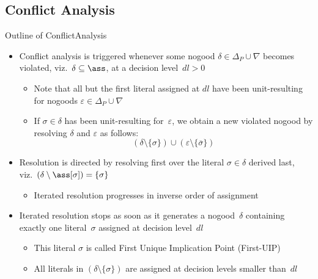 \subsection{Conflict Analysis}
\begin{frame}{Outline of {ConflictAnalysis}}
\begin{itemize}
\item Conflict analysis is triggered whenever
      some nogood $\delta\in\Delta_P\cup\nabla$
      becomes violated, viz.\ $\delta\subseteq\ass$,
      at a decision level~$\mathit{dl}>0$
      \begin{itemize}
      \item Note that all but the first literal assigned at $\mathit{dl}$
        have been unit-resulting for nogoods
        $\varepsilon\in\Delta_P\cup\nabla$
      \item If $\sigma\in\delta$ has been unit-resulting for~$\varepsilon$,
        we obtain a new violated nogood
        by resolving $\delta$ and $\varepsilon$ as follows:
        \[
        (\delta\setminus\{\sigma\})\cup(\varepsilon\setminus\{\overline{\sigma}\})
        \]
      \end{itemize}
\pause
\item Resolution is directed by resolving first over the literal $\sigma\in\delta$
      derived last, viz.\ $(\delta\setminus\ass[\sigma])=\{\sigma\}$
      \begin{itemize}
      \item Iterated resolution progresses in inverse
                     order of assignment
      \end{itemize}
\pause
\item Iterated resolution stops as soon as it generates
      a nogood~$\delta$ containing exactly one literal~$\sigma$ assigned
      at decision level~$\mathit{dl}$
  \begin{itemize}
  \item This literal $\sigma$ is called \alert{First Unique Implication Point} (First-UIP)
  \item All literals in $(\delta\setminus\{\sigma\})$ are assigned
        at decision levels smaller than~$\mathit{dl}$
  \end{itemize}
\end{itemize}
\end{frame}
\begin{frame}[c]

\end{frame}
